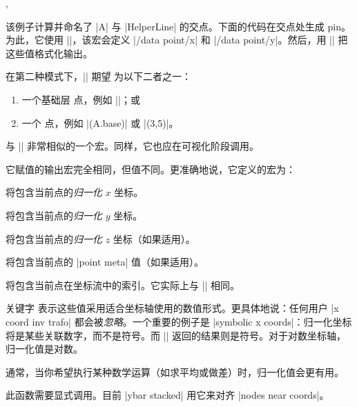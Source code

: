 \begin{commandlist}{\pgfplotspointgetcoordinates,\pgfplotspointgetcoordinates{}}
\begin{codeexample}[]
\end{codeexample}
    该例子计算并命名了 |A| 与 |HelperLine| 的交点。下面的代码在交点处生成 pin。为此，它使用
    |\pgfplotspointgetcoordinates|，该宏会定义 |/data point/x|
    和 |/data point/y|。然后，用 |\pgfmathprintnumber| 把这些值格式化输出。

    在第二种模式下，|\pgfplotspointgetcoordinates| 期望  为以下二者之一：
    \begin{enumerate}
        \item 一个基础层 \PGF{} 点，例如 ||；或
        \item 一个 \Tikz{} 点，例如 |(A.base)| 或 |(3,5)|。
    \end{enumerate}
\end{commandlist}

\begin{command}{\pgfplotspointgetnormalizedcoordinates}
    与 |\pgfplotspointgetcoordinates| 非常相似的一个宏。同样，它也应在可视化阶段调用。

    它赋值的输出宏完全相同，但值不同。更准确地说，它定义的宏为：

     将包含当前点的\emph{归一化} $x$ 坐标。

     将包含当前点的\emph{归一化} $y$ 坐标。

     将包含当前点的\emph{归一化} $z$ 坐标（如果适用）。

     将包含当前点的
    |point meta| 值（如果适用）。

     将包含当前点在坐标流中的索引。它实际上与 |\coordindex| 相同。

    关键字  表示这些值采用适合坐标轴使用的数值形式。更具体地说：任何用户 |x coord inv trafo| 都会被\emph{忽略}。一个重要的例子是 |symbolic x coords|：归一化坐标将是某些关联数字，而不是符号。而
    |\pgfplotspointgetcoordinates| 返回的结果则是符号。对于对数坐标轴，归一化值是对数。

    通常，当你希望执行某种数学运算（如求平均或做差）时，归一化值会更有用。

    此函数需要显式调用。目前 |ybar stacked| 用它来对齐 |nodes near coords|。
\end{command}


